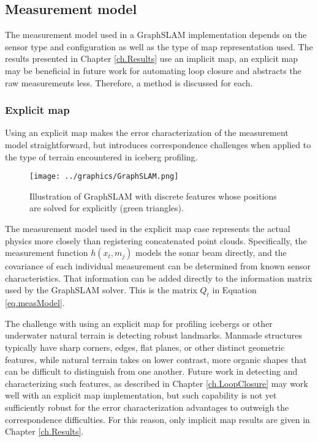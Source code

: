 \subsection{Measurement model}

The measurement model used in a GraphSLAM implementation depends on the sensor type and configuration as well as the type of map representation used. The results presented in Chapter \ref{ch.Results} use an implicit map, an explicit map may be beneficial in future work for automating loop closure and abstracts the raw measurements less. Therefore, a method is discussed for each.

\subsubsection{Explicit map}

Using an explicit map makes the error characterization of the measurement model straightforward, but introduces correspondence challenges when applied to the type of terrain encountered in iceberg profiling. 

\begin{figure}[htb]
   \centering
   \texttt{[image: ../graphics/GraphSLAM.png]} %
   \caption{Illustration of GraphSLAM with discrete features whose positions are solved for explicitly (green triangles).  }
   \label{fig:ExplicitMap}
\end{figure}

The measurement model used in the explicit map case represents the actual physics more closely than registering concatenated point clouds. Specifically, the measurement function $h\left(x_t,m_j\right)$ models the sonar beam directly, and the covariance of each individual measurement can be determined from known sensor characteristics. That information can be added directly to the information matrix used by the GraphSLAM solver. This is the matrix $Q_t$ in Equation \ref{eq.measModel}. 

The challenge with using an explicit map for profiling icebergs or other underwater natural terrain is detecting robust landmarks. Manmade structures typically have sharp corners, edges, flat planes, or other distinct geometric features, while natural terrain takes on lower contrast, more organic shapes that can be difficult to distinguish from one another. Future work in detecting and characterizing such features, as described in Chapter \ref{ch.LoopClosure} may work well with an explicit map implementation, but such capability is not yet sufficiently robust for the error characterization advantages to outweigh the correspondence difficulties. For this reason, only implicit map results are given in Chapter \ref{ch.Results}.




